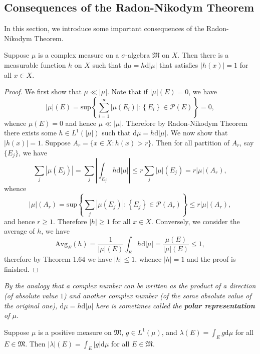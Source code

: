 \subsection{Consequences of the Radon-Nikodym Theorem}
In this section, we introduce some important consequences of the Radon-Nikodym Theorem.
\begin{theorem}
Suppose $\mu$ is a complex measure on a $\sigma$-algebra $\mathfrak{M}$ on $X$. Then there is a measurable function $h$ on $X$ such that $\mathrm{d}\mu=h\mathrm{d}|\mu|$ that satisfies $|h(x)|=1$ for all $x\in X$.
\end{theorem}
\begin{proof}
We first show that $\mu\ll|\mu|$. Note that if $|\mu|(E)=0$, we have 
$$
\left| \mu \right|\left( E \right) =\mathrm{sup}\left\{ \sum_{i=1}^{\infty}{\left| \mu \left( E_i \right) \right|}:\left\{ E_i \right\} \in \mathcal{P} \left( E \right) \right\} =0,
$$
whence $\mu(E)=0$ and hence $\mu\ll|\mu|$. Therefore by Radon-Nikodym Theorem there exists some $h\in L^1(|\mu|)$ such that $\mathrm{d}\mu=h\mathrm{d}|\mu|$. We now show that $|h(x)|=1$. Suppose $A_r=\{x\in X:h(x)>r\}$. Then for all partition of $A_r$, say $\{E_j\}$, we have 
$$
\sum_j{\left| \mu \left( E_j \right) \right|}=\sum_j{\left| \int_{E_j}{h\mathrm{d}\left| \mu \right|} \right|}\le r\sum_j{\left| \mu \right|\left( E_j \right)}=r\left| \mu \right|\left( A_r \right) ,
$$
whence 
$$
\left| \mu \right|\left( A_r \right) =\mathrm{sup}\left\{ \sum_j{\left| \mu \left( E_j \right) \right|}:\left\{ E_j \right\} \in \mathcal{P} \left( A_r \right) \right\} \le r\left| \mu \right|\left( A_r \right) ,
$$
and hence $r\ge 1$. Therefore $|h|\ge 1$ for all $x\in X$. Conversely, we consider the average of $h$, we have 
$$
\mathrm{Avg}_E\left( h \right) =\frac{1}{\left| \mu \right|\left( E \right)}\int_E{h\mathrm{d}\left| \mu \right|}=\frac{\mu \left( E \right)}{\left| \mu \right|\left( E \right)}\le 1,
$$
therefore by Theorem 1.64 we have $|h|\le 1$, whence $|h|=1$ and the proof is finished.
\end{proof}
\begin{note}\em
By the analogy that a complex number can be written as the product of a direction (of absolute value $1$) and another complex number (of the same absolute value of the original one), $\mathrm{d}\mu=h\mathrm{d}|\mu|$ here is sometimes called the \textbf{polar representation} of $\mu$.
\end{note}
\begin{theorem}
Suppose $\mu$ is a positive measure on $\mathfrak{M}$, $g\in L^1(\mu)$, and $\lambda(E)=\int_Eg\mathrm{d}\mu$ for all $E\in\mathfrak{M}$. Then $|\lambda|(E)=\int_E|g|\mathrm{d}\mu$ for all $E\in\mathfrak{M}$.
\end{theorem}
